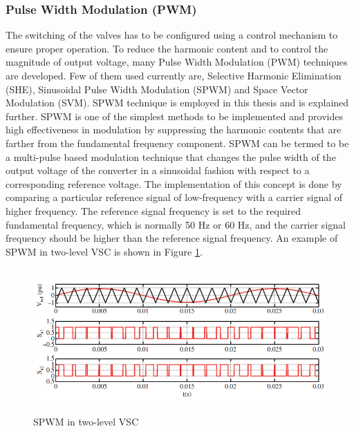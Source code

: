 \subsubsection{Pulse Width Modulation (PWM)}
The switching of the valves has to be configured using a control mechanism to ensure proper operation. To reduce the harmonic content and to control the magnitude of output voltage, many Pulse Width Modulation (\gls{PWM}) techniques are developed. Few of them used currently are, Selective Harmonic Elimination (SHE), Sinusoidal Pulse Width Modulation (SPWM) and Space Vector Modulation (SVM). SPWM technique is employed in this thesis and is explained further. SPWM is one of the simplest methods to be implemented and provides high effectiveness in modulation by suppressing the harmonic contents that are farther from the fundamental frequency component. SPWM can be termed to be a multi-pulse based modulation technique that changes the pulse width of the output voltage of the converter in a sinusoidal fashion with respect to a corresponding reference voltage. The implementation of this concept is done by comparing a particular reference signal of low-frequency with a carrier signal of higher frequency. The reference signal frequency is set to the required fundamental frequency, which is normally 50 Hz or 60 Hz, and the carrier signal frequency should be higher than the reference signal frequency. An example of SPWM in two-level \gls{VSC} is shown in Figure \ref{fig:2levelVSC_switching}.

\begin{figure}[H]
\centering
    \includegraphics[height = 5.5cm,width = 13.5cm]{Diagrams/Chapter_2/2levelVSC_switching.PNG}
    \caption{SPWM in two-level VSC \cite{noauthor_appendix_2014-1}}
    \label{fig:2levelVSC_switching}
\end{figure}

